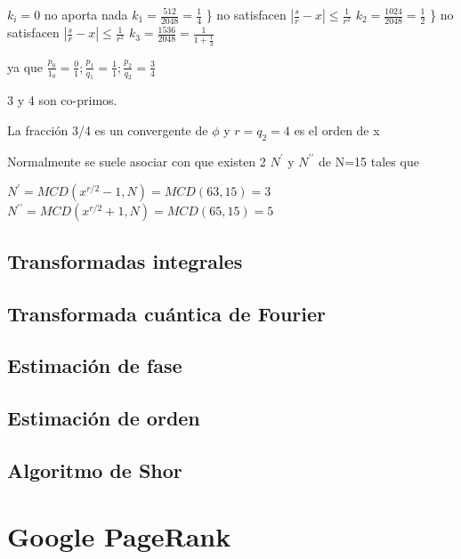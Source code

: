 \documentclass[11pt, spanish]{report}
\begin{document}
$k_i = 0$ no aporta nada
$k_1 = \frac{512}{2048} = \frac{1}{4}$ \} no satisfacen $|\frac{s}{r} - x| \leq \frac{1}{r^2}$
$k_2 = \frac{1024}{2048} = \frac{1}{2}$ \} no satisfacen $|\frac{s}{r} - x| \leq \frac{1}{r^2}$
$k_3 = \frac{1536}{2048} = \frac{1}{1+\frac{1}{3}}$

ya que $\frac{p_0}{1_0} = \frac{0}{1}; \frac{p_1}{q_1} = \frac{1}{1}; \frac{p_2}{q_2} = \frac{3}{4}$

3 y 4 son co-primos.

La fracción 3/4 es un convergente de $\phi$ y $r = q_2 = 4$ es el orden de x

Normalmente se suele asociar con que existen 2 $N^\prime$ y $N^{\prime\prime}$ de N=15 tales que

$N^\prime = MCD(x^{r/2} - 1, N) = MCD(63, 15) = 3$
$N^{\prime\prime} = MCD(x^{r/2} + 1, N) = MCD(65, 15) = 5$























\section{Transformadas integrales}

\section{Transformada cuántica de Fourier}

\section{Estimación de fase}

\section{Estimación de orden}

\section{Algoritmo de Shor}

\chapter{Google PageRank}
\end{document}
